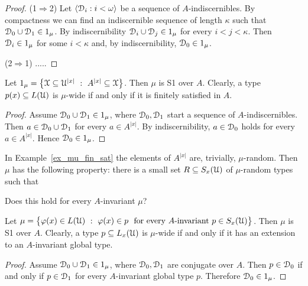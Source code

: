 \documentclass{amsproc}
\begin{document}
\begin{proof}
  (1$\Rightarrow$2)  Let $\langle\EuScript D_i:i<\omega\rangle$ be a sequence of $A$-indiscernibles.
  By compactness we can find an indiscernible sequence of length $\kappa$ such that $\EuScript D_0\cup\EuScript D_1\in1_\mu$.
  By indiscernibility $\EuScript D_i\cup\EuScript D_j\in1_\mu$ for every $i<j<\kappa$.
  Then $\EuScript D_i\in1_\mu$ for some $i<\kappa$ and, by indiscernibility,  $\EuScript D_0\in1_\mu$.

  (2$\Rightarrow$1) .....
\end{proof}

\begin{example}\label{ex_mu_fin_sat}
  Let $1_\mu=\big\{\EuScript X\subseteq\EuScript U^{|x|}\ :\ A^{|x|}\subseteq\EuScript X\big\}$.
  Then $\mu$ is S1 over $A$.
  Clearly, a type $p(x)\subseteq L(\EuScript U)$ is $\mu$-wide if and only if it is finitely satisfied in $A$.
\end{example}

\begin{proof} 
  Assume $\EuScript D_0\cup\EuScript D_1\in1_\mu$, where $\EuScript D_0,\EuScript D_1$ start a sequence of $A$-indiscernibles.
  Then $a\in\EuScript D_0\cup\EuScript D_1$ for every $a\in A^{|x|}$.
  By indiscernibility, $a\in\EuScript D_0$ holds for every $a\in A^{|x|}$.
  Hence $\EuScript D_0\in1_\mu$.
\end{proof}

\begin{exercise}
  In Example~\ref{ex_mu_fin_sat} the elements of $A^{|x|}$ are, trivially, $\mu$-random.
  Then $\mu$ has the following property: there is a small set $R\subseteq S_x(\EuScript U)$ of $\mu$-random types such that 
  
  
  Does this hold for every $A$-invariant $\mu$\;?
\end{exercise}

\begin{example}\label{ex_invariant_filter}
  Let $\mu=\big\{\varphi(x)\in L(\EuScript U)\ :\ \varphi(x)\in p\ {\rm\ for\ every\ } A\textrm{-invariant}\ p\in S_x(\EuScript U) \big\}$.
  Then $\mu$ is S1 over $A$.
  Clearly, a type $p\subseteq L_x(\EuScript U)$ is $\mu$-wide if and only if it has an extension to an $A$-invariant global type.
\end{example}

\begin{proof}
  Assume $\EuScript D_0\cup\EuScript D_1\in1_\mu$, where $\EuScript D_0,\EuScript D_1$ are conjugate over $A$.
  Then $p\in\EuScript D_0$ if and only if $p\in\EuScript D_1$ for every $A$-invariant global type $p$.
  Therefore $\EuScript D_0\in1_\mu$.
\end{proof}
\end{document}
